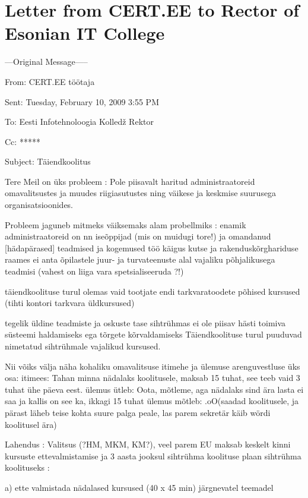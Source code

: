 \chapter{Letter from CERT.EE to Rector of Esonian IT College}
\label{Letter from CERT.EE to Rector of Esonian IT College}
\begin{spacing}{1}
\small
---Original Message-----

From: CERT.EE töötaja\par
Sent: Tuesday, February 10, 2009 3:55 PM \par
To: Eesti Infotehnoloogia Kolledž Rektor \par
Cc: ***** \par
Subject: Täiendkoolitus\par

Tere
Meil on üks probleem  :
Pole piisavalt haritud administraatoreid omavalitsustes ja 
muudes riigiasutustes ning väikese ja keskmise suurusega organisatsioonides.

Probleem jaguneb mitmeks väiksemaks alam probellmiks :
enamik administraatoreid on nn iseõppijad (mis on muidugi tore!)
ja omandanud [hädapärased] teadmised ja kogemused töö käigus
kutse ja rakenduskõrghariduse raames ei anta õpilastele juur- ja
 turvateenuste alal vajaliku põhjalikusega teadmisi 
(vahest on liiga vara spetsialiseeruda ?!)

täiendkoolituse turul olemas vaid tootjate endi tarkvaratoodete põhised kursused 
(tihti kontori tarkvara üldkursused)

tegelik üldine teadmiste ja oskuste tase sihtrühmas 
ei ole piisav hästi toimiva süsteemi haldamiseks 
ega tõrgete kõrvaldamiseks
Täiendkoolituse turul puuduvad nimetatud sihtrühmale 
vajalikud kursused.

Nii võiks välja näha kohaliku omavalitsuse itimehe ja ülemuse arenguvestluse üks osa:
itimees: Tahan minna nädalaks koolitusele, maksab 15 tuhat, see teeb vaid 3 tuhat ühe päeva eest. ülemus ütleb: Oota, mõtleme, aga nädalaks sind ära lasta ei saa ja kallis on see ka, ikkagi 15 tuhat ülemus mõtleb: .oO(saadad koolitusele, ja pärast läheb teise kohta suure palga peale, las parem sekretär käib wördi koolitusel ära)

Lahendus :
Valitsus (?HM, MKM, KM?), veel parem EU maksab keskelt kinni kursuste ettevalmistamise ja 3 aasta jooksul sihtrühma koolituse plaan sihtrühma koolituseks :

a) ette valmistada nädalased kursused (40 x 45 min) järgnevatel teemadel


\end{spacing}
